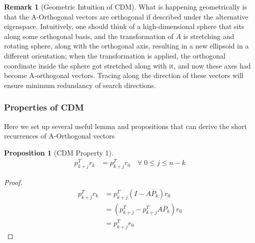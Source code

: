\documentclass[]{article}
\theoremstyle{definition}
\newtheorem{prop}{Proposition}[section]  %
\newtheorem{remark}{Remark}[subsection]  %
\begin{document}
            \begin{remark}[Geometric Intuition of CDM]
                What is happening geometrically is that the A-Orthogonal vectors are orthogonal if described under the alternative eigenspace. Intuitively, one should think of a high-dimensional sphere that sits along some orthogonal basis, and the transformation of $A$ is stretching and rotating sphere, along with the orthogonal axis, resulting in a new ellipsoid in a different orientation; when the transformation is applied, the orthogonal coordinate inside the sphere got stretched along with it, and now these axes had become A-orthogonal vectors. Tracing along the direction of these vectors will ensure minimum redundancy of search directions. 
            \end{remark}
        \subsubsection{Properties of CDM}
            Here we set up several useful lemma and propositions that can derive the short recurrences of A-Orthogonal vectors 
            \begin{prop}[CDM Property 1]
                \begin{align}
                    p_{k + j}^Tr_k &= p_{k + j}^Tr_0 \quad \forall \; 0 \le j \le n - k
                \end{align}
            \end{prop}
            \begin{proof}
                \begin{align}
                    p_{k + j}^Tr_k &= p_{k + j}^T(I - A\overline{P}_k)r_0
                    \\
                    &= (p^T_{k + j} - p^T_{k + j}A\overline{P}_k)r_0
                    \\
                    &= p_{k + j}^Tr_0    
                \end{align}
            \end{proof}
\end{document}
